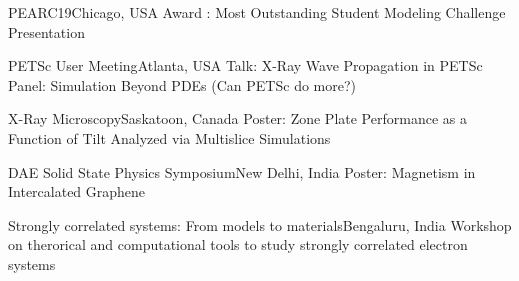 {PEARC19}{Chicago, USA} 
{\newline Award : Most Outstanding Student Modeling Challenge Presentation}
{}
{}

{PETSc User Meeting}{Atlanta, USA}
{\newline Talk: X-Ray Wave Propagation in PETSc} 
{\newline Panel: Simulation Beyond PDEs (Can PETSc do more?)}
{}


{X-Ray Microscopy}{Saskatoon, Canada}
{\newline Poster: Zone Plate Performance as a Function of Tilt Analyzed via Multislice Simulations} 
{}
{}

{DAE Solid State Physics Symposium}{New Delhi, India}
{\newline Poster: Magnetism in Intercalated Graphene} 
{}
{}

{Strongly correlated systems: From models to materials}{Bengaluru, India}
{\newline Workshop on therorical and computational tools to study strongly correlated electron systems} 
{}
{}
